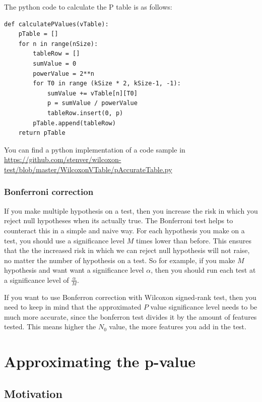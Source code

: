 \documentclass[12pt]{article}
\begin{document}
The python code to calculate the P table is as follows:

\begin{verbatim}
def calculatePValues(vTable):
    pTable = []
    for n in range(nSize):
        tableRow = []
        sumValue = 0
        powerValue = 2**n
        for T0 in range (kSize * 2, kSize-1, -1):
            sumValue += vTable[n][T0]
            p = sumValue / powerValue
            tableRow.insert(0, p)
        pTable.append(tableRow)
    return pTable

\end{verbatim}

You can find a python implementation of a code sample in
\url{https://github.com/stenver/wilcoxon-test/blob/master/WilcoxonVTable/pAccurateTable.py}

\subsubsection{Bonferroni correction}

If you make multiple hypothesis on a test, then you increase the risk in which you reject null hypotheses when its actually true. The Bonferroni test helps to counteract this in a simple and naive way. For each hypothesis you make on a test, you should use a significance level $M$ times lower than before. This ensures that the the increased risk in which we can reject null hypothesis will not raise, no matter the number of hypothesis on a test. So for example, if you make $M$ hypothesis and want want a significance level $\alpha$,  then you should run each test at a significance level of $\frac{\alpha}{M}$.

If you want to use Bonferron correction with Wilcoxon signed-rank test, then you need to keep in mind that the approximated $P$ value significance level needs to be much more accurate, since the bonferron test divides it by the amount of features tested. This means higher the $N_0$ value, the more features you add in the test.

\newpage

\section{Approximating the p-value}

\subsection{Motivation}
\end{document}
